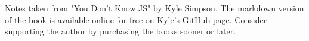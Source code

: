 Notes taken from "You Don't Know JS" by Kyle Simpson. The markdown version of the book is available online for free \href{https://github.com/getify/You-Dont-Know-JS}{on Kyle's GitHub page}. Consider supporting the author by purchasing the books sooner or later. 
